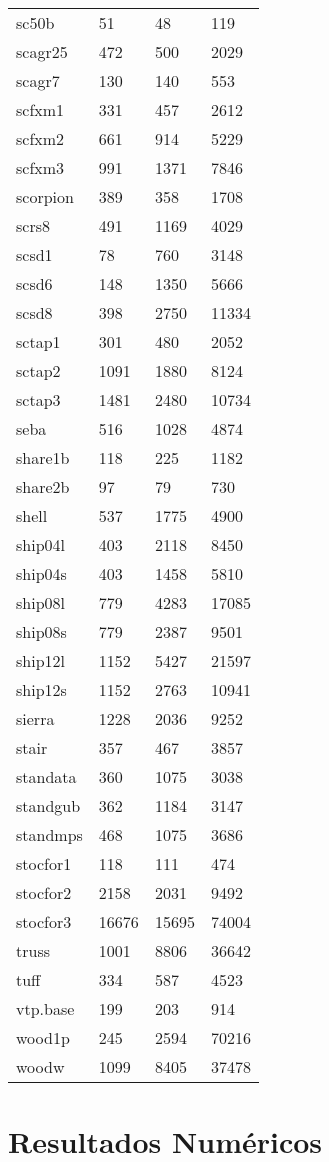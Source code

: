 \begin{tabular}{llll}
sc50b    & 51    & 48    & 119      \\
scagr25  & 472   & 500   & 2029     \\
scagr7   & 130   & 140   & 553      \\
scfxm1   & 331   & 457   & 2612     \\
scfxm2   & 661   & 914   & 5229     \\
scfxm3   & 991   & 1371  & 7846     \\
scorpion & 389   & 358   & 1708     \\
scrs8    & 491   & 1169  & 4029     \\
scsd1    & 78    & 760   & 3148     \\
scsd6    & 148   & 1350  & 5666     \\
scsd8    & 398   & 2750  & 11334    \\
sctap1   & 301   & 480   & 2052     \\
sctap2   & 1091  & 1880  & 8124     \\
sctap3   & 1481  & 2480  & 10734    \\
seba     & 516   & 1028  & 4874     \\
share1b  & 118   & 225   & 1182     \\
share2b  & 97    & 79    & 730      \\
shell    & 537   & 1775  & 4900     \\
ship04l  & 403   & 2118  & 8450     \\
ship04s  & 403   & 1458  & 5810     \\
ship08l  & 779   & 4283  & 17085    \\
ship08s  & 779   & 2387  & 9501     \\
ship12l  & 1152  & 5427  & 21597    \\
ship12s  & 1152  & 2763  & 10941    \\
sierra   & 1228  & 2036  & 9252     \\
stair    & 357   & 467   & 3857     \\
standata & 360   & 1075  & 3038     \\
standgub & 362   & 1184  & 3147     \\
standmps & 468   & 1075  & 3686     \\
stocfor1 & 118   & 111   & 474      \\
stocfor2 & 2158  & 2031  & 9492     \\
stocfor3 & 16676 & 15695 & 74004    \\
truss    & 1001  & 8806  & 36642    \\
tuff     & 334   & 587   & 4523     \\
vtp.base & 199   & 203   & 914      \\
wood1p   & 245   & 2594  & 70216    \\
woodw    & 1099  & 8405  & 37478    \\
\bottomrule
\end{tabular}

\section{Resultados Numéricos}